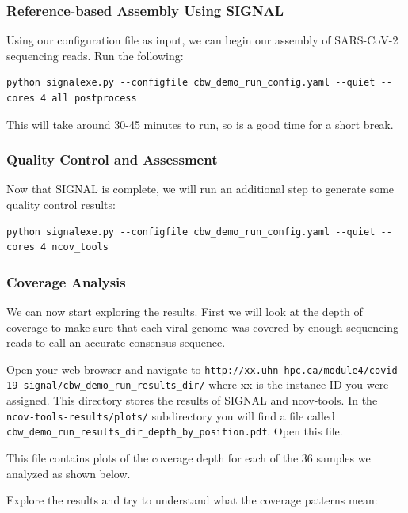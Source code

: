 \documentclass[
]{book}
\begin{document}
\subsubsection{Reference-based Assembly Using SIGNAL}\label{reference-based-assembly-using-signal}

Using our configuration file as input, we can begin our assembly of SARS-CoV-2 sequencing reads. Run the following:

\begin{verbatim}
python signalexe.py --configfile cbw_demo_run_config.yaml --quiet --cores 4 all postprocess
\end{verbatim}

This will take around 30-45 minutes to run, so is a good time for a short break.

\subsubsection{Quality Control and Assessment}\label{quality-control-and-assessment}

Now that SIGNAL is complete, we will run an additional step to generate some quality control results:

\begin{verbatim}
python signalexe.py --configfile cbw_demo_run_config.yaml --quiet --cores 4 ncov_tools
\end{verbatim}

\subsubsection{Coverage Analysis}\label{coverage-analysis}

We can now start exploring the results. First we will look at the depth of coverage to make sure that each viral genome was covered by enough sequencing reads to call an accurate consensus sequence.

Open your web browser and navigate to \texttt{http://xx.uhn-hpc.ca/module4/covid-19-signal/cbw\_demo\_run\_results\_dir/} where xx is the instance ID you were assigned. This directory stores the results of SIGNAL and ncov-tools. In the \texttt{ncov-tools-results/plots/} subdirectory you will find a file called \texttt{cbw\_demo\_run\_results\_dir\_depth\_by\_position.pdf}. Open this file.

This file contains plots of the coverage depth for each of the 36 samples we analyzed as shown below.

Explore the results and try to understand what the coverage patterns mean:
\end{document}
